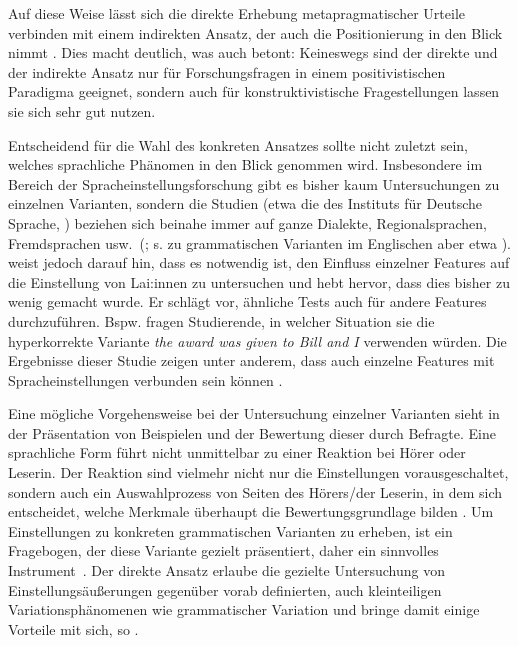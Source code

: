 Auf diese Weise lässt sich die direkte Erhebung metapragmatischer Urteile verbinden mit einem indirekten Ansatz, der auch die Positionierung in den Blick nimmt \citep[s.][110]{Liebscher.2014}. 
Dies macht deutlich, was auch \citet[145]{Soukup.2014} betont:
Keineswegs sind der direkte und der indirekte Ansatz nur für Forschungsfragen in einem positivistischen Paradigma geeignet, sondern auch für konstruktivistische Fragestellungen lassen sie sich sehr gut nutzen. 

Entscheidend für die Wahl des konkreten Ansatzes sollte nicht zuletzt sein, welches sprachliche Phänomen in den Blick genommen wird. 
Insbesondere im Bereich der Spracheinstellungsforschung gibt es bisher kaum Untersuchungen zu einzelnen Varianten, sondern die Studien (etwa die des Instituts für Deutsche Sprache, \citealp[s.][]{Adler.2018}) beziehen sich beinahe immer auf ganze Dialekte, Regionalsprachen, Fremdsprachen usw.~(\citealp[s.][1251]{Garrett2005}; s. zu grammatischen Varianten im Englischen aber etwa \citealp{Ebner.2018}).
\citet[39--40]{Preston2004} weist jedoch darauf hin, dass es notwendig ist, den Einfluss einzelner Features auf die Einstellung von Lai:innen zu untersuchen und hebt hervor, dass dies bisher zu wenig gemacht wurde. 
Er schl{\"a}gt vor, {\"a}hnliche Tests auch f{\"u}r andere Features durchzuf{\"u}hren. Bspw. fragen \citet{AlBanyan.1998} Studierende, in welcher Situation sie die hyperkorrekte Variante  \textit{the award was given to Bill and I }verwenden w{\"u}rden. 
Die Ergebnisse dieser Studie zeigen unter anderem, dass auch einzelne Features mit Spracheinstellungen verbunden sein k{\"o}nnen \citep[s.][44]{Preston2004}.

Eine m{\"o}gliche Vorgehensweise bei der Untersuchung einzelner Varianten sieht \citet[1693]{Preston2005} in der Pr{\"a}sentation von Beispielen und der Bewertung dieser durch Befragte.
Eine sprachliche Form f{\"u}hrt nicht unmittelbar zu einer Reaktion bei H{\"o}rer oder Leserin. 
Der Reaktion sind vielmehr nicht nur die Einstellungen vorausgeschaltet, sondern auch ein Auswahlprozess von Seiten des H{\"o}rers/der Leserin, in dem sich entscheidet, welche Merkmale {\"u}berhaupt die Bewertungsgrundlage bilden \citep[s.][218]{Cargile.1994}. 
Um Einstellungen zu konkreten grammatischen Varianten zu erheben, ist ein Fragebogen, der diese Variante gezielt pr{\"a}sentiert, daher ein sinnvolles Instrument~\citep[s.][218]{Cargile.1994}. 
Der direkte Ansatz erlaube die gezielte Untersuchung von %
Einstellungsäußerungen %
gegen{\"u}ber vorab definierten, auch kleinteiligen Variationsph{\"a}nomenen wie grammatischer Variation und bringe damit einige Vorteile mit sich, so \citet[213]{Cargile.1994}.

